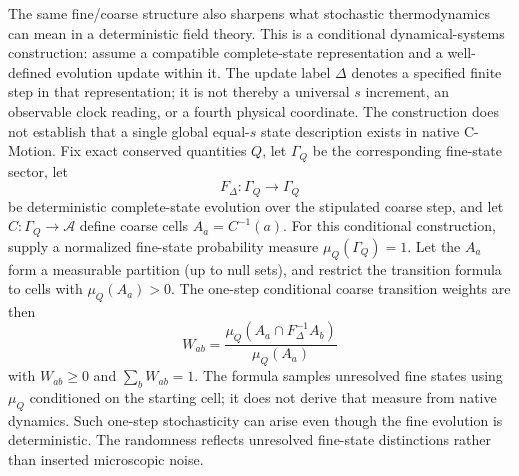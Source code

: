 \documentclass[11pt]{article}
\theoremstyle{definition}
\newcommand{\cmotion}{\mbox{C-Motion}}
\begin{document}
The same fine/coarse structure also sharpens what stochastic thermodynamics can mean in a
deterministic field theory.  This is a conditional dynamical-systems construction:
assume a compatible complete-state representation and a well-defined evolution
update within it.  The update label $\Delta$ denotes a specified finite step in
that representation; it is not thereby a universal $s$ increment, an observable
clock reading, or a fourth physical coordinate.  The construction does not
establish that a single global equal-$s$ state description exists in native
\cmotion{}.  Fix exact conserved quantities $Q$, let $\Gamma_Q$ be the
corresponding fine-state sector, let
\begin{equation}
  F_\Delta:\Gamma_Q\rightarrow\Gamma_Q
  \label{eq:fine-map}
\end{equation}
be deterministic complete-state evolution over the stipulated coarse step, and let
$C:\Gamma_Q\rightarrow\mathcal A$ define coarse cells $A_a=C^{-1}(a)$.  For this conditional construction, supply a normalized fine-state probability measure
$\mu_Q(\Gamma_Q)=1$.  Let the $A_a$ form a measurable partition (up to null sets), and
restrict the transition formula to cells with $\mu_Q(A_a)>0$.  The one-step conditional
coarse transition weights are then
\begin{equation}
  \boxed{
  W_{ab}
  =\frac{\mu_Q\!\left(A_a\cap F_\Delta^{-1}A_b\right)}{\mu_Q(A_a)}}
  \label{eq:coarse-one-step-kernel}
\end{equation}
with $W_{ab}\geq0$ and $\sum_bW_{ab}=1$.  The formula samples unresolved fine
states using $\mu_Q$ conditioned on the starting cell; it does not derive that measure
from native dynamics.  Such one-step stochasticity can arise even though the fine evolution
is deterministic.  The randomness reflects unresolved fine-state distinctions rather than
inserted microscopic noise.
\end{document}
